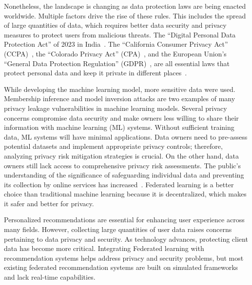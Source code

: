 Nonetheless, the landscape is changing as data protection laws are being enacted worldwide. Multiple factors drive the rise of these rules. This includes the spread of large quantities of data, which requires better data security and privacy measures to protect users from malicious threats. The ``Digital Personal Data Protection Act'' of 2023 in India~\cite{ref3}. The ``California Consumer Privacy Act'' (CCPA)~\cite{ref4}, the ``Colorado Privacy Act'' (CPA)~\cite{ref5}, and the European Union's ``General Data Protection Regulation'' (GDPR)~\cite{ref6}, are all essential laws that protect personal data and keep it private in different places~\cite{ref7}.

While developing the machine learning model, more sensitive data were used. Membership inference and model inversion attacks are two examples of many privacy leakage vulnerabilities in machine learning models. Several privacy concerns compromise data security and make owners less willing to share their information with machine learning (ML) systems. Without sufficient training data, ML systems will have minimal applications. Data owners need to pre-assess potential datasets and implement appropriate privacy controls; therefore, analyzing privacy risk mitigation strategies is crucial. On the other hand, data owners still lack access to comprehensive privacy risk assessments. The public's understanding of the significance of safeguarding individual data and preventing its collection by online services has increased~\cite{ref8}. Federated learning is a better choice than traditional machine learning because it is decentralized, which makes it safer and better for privacy.

Personalized recommendations are essential for enhancing user experience across many fields. However, collecting large quantities of user data raises concerns pertaining to data privacy and security. As technology advances, protecting client data has become more critical. Integrating Federated learning with recommendation systems helps address privacy and security problems, but most existing federated recommendation systems are built on simulated frameworks and lack real-time capabilities.

